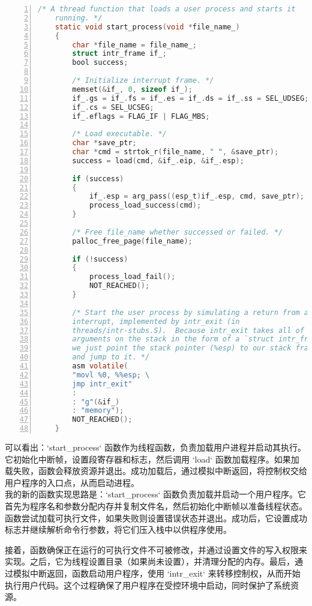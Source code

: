\documentclass{article}
\begin{document}
	\begin{lstlisting}[xleftmargin = 4em,xrightmargin = 4em, aboveskip = 1em, numbers = left, language = C,title=原本的src/userprog/process.c - start\_process]
    /* A thread function that loads a user process and starts it
    running. */
    static void start_process(void *file_name_)
    {
    	char *file_name = file_name_;
    	struct intr_frame if_;
    	bool success;
    	
    	/* Initialize interrupt frame. */
    	memset(&if_, 0, sizeof if_);
    	if_.gs = if_.fs = if_.es = if_.ds = if_.ss = SEL_UDSEG;
    	if_.cs = SEL_UCSEG;
    	if_.eflags = FLAG_IF | FLAG_MBS;
    	
    	/* Load executable. */
    	char *save_ptr;
    	char *cmd = strtok_r(file_name, " ", &save_ptr);
    	success = load(cmd, &if_.eip, &if_.esp);
    	
    	if (success)
    	{
    		if_.esp = arg_pass((esp_t)if_.esp, cmd, save_ptr);
    		process_load_success(cmd);
    	}
    	
    	/* Free file_name whether successed or failed. */
    	palloc_free_page(file_name);
    	
    	if (!success)
    	{
    		process_load_fail();
    		NOT_REACHED();
    	}
    	
    	/* Start the user process by simulating a return from an
    	interrupt, implemented by intr_exit (in
    	threads/intr-stubs.S).  Because intr_exit takes all of its
    	arguments on the stack in the form of a `struct intr_frame',
    	we just point the stack pointer (%esp) to our stack frame
    	and jump to it. */
    	asm volatile(
    	"movl %0, %%esp; \
    	jmp intr_exit"
    	:
    	: "g"(&if_)
    	: "memory");
    	NOT_REACHED();
    }
	\end{lstlisting}
	
	可以看出：`start\_process` 函数作为线程函数，负责加载用户进程并启动其执行。它初始化中断帧，设置段寄存器和标志，然后调用 `load` 函数加载程序。如果加载失败，函数会释放资源并退出。成功加载后，通过模拟中断返回，将控制权交给用户程序的入口点，从而启动进程。\\
	
	我的新的函数实现思路是：`start\_process` 函数负责加载并启动一个用户程序。它首先为程序名和参数分配内存并复制文件名，然后初始化中断帧以准备线程状态。函数尝试加载可执行文件，如果失败则设置错误状态并退出。成功后，它设置成功标志并继续解析命令行参数，将它们压入栈中以供程序使用。
	
	接着，函数确保正在运行的可执行文件不可被修改，并通过设置文件的写入权限来实现。之后，它为线程设置目录（如果尚未设置），并清理分配的内存。最后，通过模拟中断返回，函数启动用户程序，使用 `intr\_exit` 来转移控制权，从而开始执行用户代码。这个过程确保了用户程序在受控环境中启动，同时保护了系统资源。
	
\end{document}
